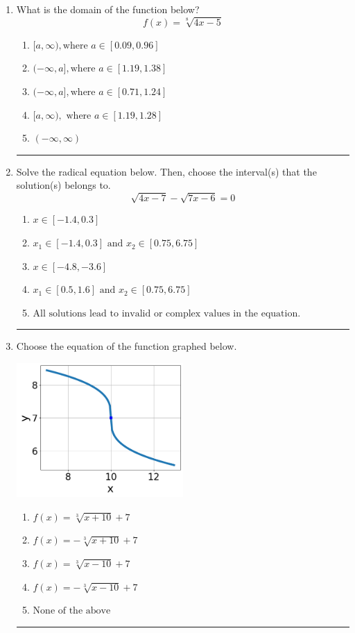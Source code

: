 \documentclass[14pt]{extbook}
\newcommand{\litem}[1]{\item#1\hspace*{-1cm}\rule{\textwidth}{0.4pt}}
\begin{document}
\begin{enumerate}
{\begin{enumerate}[label=\Alph*.]
\end{enumerate} }
\litem{
What is the domain of the function below?\[ f(x) = \sqrt[8]{4 x - 5} \]\begin{enumerate}[label=\Alph*.]
\item \( [a, \infty), \text{where } a \in [0.09, 0.96] \)
\item \( (-\infty, a], \text{where } a \in [1.19, 1.38] \)
\item \( (-\infty, a], \text{where } a \in [0.71, 1.24] \)
\item \( [a, \infty), \text{ where } a \in [1.19, 1.28] \)
\item \( (-\infty, \infty) \)

\end{enumerate} }
\litem{
Solve the radical equation below. Then, choose the interval(s) that the solution(s) belongs to.\[ \sqrt{4 x - 7} - \sqrt{7 x - 6} = 0 \]\begin{enumerate}[label=\Alph*.]
\item \( x \in [-1.4,0.3] \)
\item \( x_1 \in [-1.4, 0.3] \text{ and } x_2 \in [0.75,6.75] \)
\item \( x \in [-4.8,-3.6] \)
\item \( x_1 \in [0.5, 1.6] \text{ and } x_2 \in [0.75,6.75] \)
\item \( \text{All solutions lead to invalid or complex values in the equation.} \)

\end{enumerate} }
\litem{
Choose the equation of the function graphed below.
\begin{center}
    \includegraphics[width=0.5\textwidth]{../Figures/radicalGraphToEquationCopyB.png}
\end{center}
\begin{enumerate}[label=\Alph*.]
\item \( f(x) = \sqrt[3]{x + 10} + 7 \)
\item \( f(x) = - \sqrt[3]{x + 10} + 7 \)
\item \( f(x) = \sqrt[3]{x - 10} + 7 \)
\item \( f(x) = - \sqrt[3]{x - 10} + 7 \)
\item \( \text{None of the above} \)

\end{enumerate} }
\end{enumerate}
\end{document}
